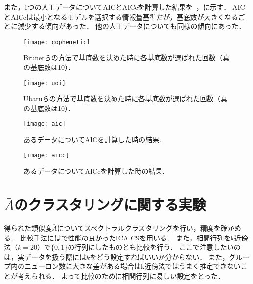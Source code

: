 また，1つの人工データについてAICとAICcを計算した結果を~，に示す．
AICとAICcは最小となるモデルを選択する情報量基準だが，基底数が大きくなるごとに減少する傾向があった．
他の人工データについても同様の傾向にあった．

\begin{figure}[htbp]
    \begin{minipage}{0.5\hsize}
        \begin{center}
            \texttt{[image: cophenetic]}
						\caption{Brunetらの方法で基底数を決めた時に各基底数が選ばれた回数（真の基底数は10）．}
            \label{fig:cophenetic}
        \end{center}
    \end{minipage}
    \begin{minipage}{0.5\hsize}
        \begin{center}
            \texttt{[image: uoi]}
						\caption{Ubaruらの方法で基底数を決めた時に各基底数が選ばれた回数（真の基底数は10）．}
            \label{fig:uoi}
        \end{center}
    \end{minipage}
\end{figure}
\begin{figure}[htbp]
    \begin{minipage}{0.5\hsize}
        \begin{center}
            \texttt{[image: aic]}
						\caption{あるデータについてAICを計算した時の結果．}
            \label{fig:aic}
        \end{center}
    \end{minipage}
    \begin{minipage}{0.5\hsize}
        \begin{center}
						\texttt{[image: aicc]}
						\caption{あるデータについてAICc\cite{Symonds2011}を計算した時の結果．}
            \label{fig:aicc}
        \end{center}
    \end{minipage}
\end{figure}

\section{$\bar{A}$のクラスタリングに関する実験}
得られた類似度$\bar{A}$についてスペクトラルクラスタリングを行い，精度を確かめる．
比較手法には\cite{Molter2018}で性能の良かったICA-CSを用いる．
また，相関行列をk近傍法（$k=20$）で$\{0,1\}$の行列にしたものとも比較を行う．
ここで注意したいのは，実データを扱う際には$k$をどう設定すればいいか分からない．
また，グループ内のニューロン数に大きな差がある場合はk近傍法ではうまく推定できないことが考えられる．
よって比較のために相関行列に易しい設定をとった．

